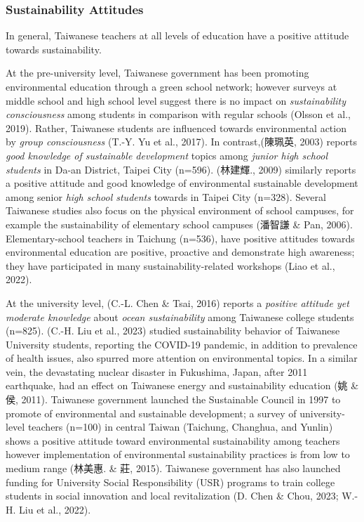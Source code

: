 \documentclass[
  letterpaper,
  DIV=11,
  numbers=noendperiod]{scrartcl}
\begin{document}
\subsubsection{Sustainability Attitudes}\label{sustainability-attitudes}

In general, Taiwanese teachers at all levels of education have a
positive attitude towards sustainability.

At the pre-university level, Taiwanese government has been promoting
environmental education through a green school network; however surveys
at middle school and high school level suggest there is no impact on
\emph{sustainability consciousness} among students in comparison with
regular schools (Olsson et al., 2019). Rather, Taiwanese students are
influenced towards environmental action by \emph{group consciousness}
(T.-Y. Yu et al., 2017). In contrast,(陳珮英, 2003) reports \emph{good
knowledge of sustainable development} topics among \emph{junior high
school students} in Da-an District, Taipei City (n=596). (林建輝., 2009)
similarly reports a positive attitude and good knowledge of
environmental sustainable development among senior \emph{high school
students} towards in Taipei City (n=328). Several Taiwanese studies also
focus on the physical environment of school campuses, for example the
sustainability of elementary school campuses (潘智謙 \& Pan, 2006).
Elementary-school teachers in Taichung (n=536), have positive attitudes
towards environmental education are positive, proactive and demonstrate
high awareness; they have participated in many sustainability-related
workshops (Liao et al., 2022).

At the university level, (C.-L. Chen \& Tsai, 2016) reports a
\emph{positive attitude yet moderate knowledge} about \emph{ocean
sustainability} among Taiwanese college students (n=825). (C.-H. Liu et
al., 2023) studied sustainability behavior of Taiwanese University
students, reporting the COVID-19 pandemic, in addition to prevalence of
health issues, also spurred more attention on environmental topics. In a
similar vein, the devastating nuclear disaster in Fukushima, Japan,
after 2011 earthquake, had an effect on Taiwanese energy and
sustainability education (姚 \& 侯, 2011). Taiwanese government launched
the Sustainable Council in 1997 to promote of environmental and
sustainable development; a survey of university-level teachers (n=100)
in central Taiwan (Taichung, Changhua, and Yunlin) shows a positive
attitude toward environmental sustainability among teachers however
implementation of environmental sustainability practices is from low to
medium range (林美惠. \& 莊, 2015). Taiwanese government has also
launched funding for University Social Responsibility (USR) programs to
train college students in social innovation and local revitalization (D.
Chen \& Chou, 2023; W.-H. Liu et al., 2022).
\end{document}

